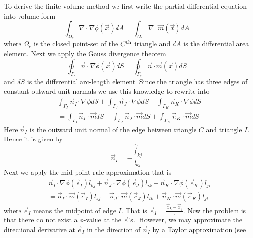 \documentclass[preprint,nocopyrightspace]{sigplanconf}
\begin{document}
To derive the finite volume method we first write the partial
differential equation into volume form
\begin{equation}
  \int_{\Omega_c} \nabla \cdot \nabla \phi(\vec x) dA 
  = 
  \int_{\Omega_c} \nabla \cdot \vec m(\vec x) dA
\end{equation}
where $\Omega_c$ is the closed point-set of the $C ^{\text{th}}$ triangle and
$dA$ is the differential area element. Next we apply the Gauss
divergence theorem
\begin{equation}
  \oint_{\Gamma_c} \vec n \cdot \nabla \phi(\vec x) dS
  = 
  \oint_{ \Gamma_c} \vec n \cdot \vec m(\vec x) dS
\end{equation}
and $dS$ is the differential arc-length element. Since the triangle
has three edges of constant outward unit normals we use this knowledge
to rewrite into
\begin{equation}
  \begin{split}
  &\int_{\Gamma_I} \vec n_I \cdot \nabla \phi dS
  +
  \int_{\Gamma_J} \vec n_J \cdot \nabla \phi dS
  +
  \int_{\Gamma_K} \vec n_K \cdot \nabla \phi dS\\
  &= 
  \int_{\Gamma_I} \vec n_I \cdot \vec m  dS
  +
  \int_{\Gamma_J} \vec n_J \cdot \vec m  dS
  +
  \int_{\Gamma_K} \vec n_K \cdot \vec m dS    
  \end{split}
\end{equation}
Here $\vec n_I$ is the outward unit normal of the edge between
triangle $C$ and triangle $I$. Hence it is given by
\begin{equation}
  \vec n_I =  - \frac{  \hat{ \vec l }_{kj}  }{  l_{kj}  }
\end{equation}
Next we apply the mid-point rule approximation that is
\begin{equation}
  \begin{split}
    &\vec n_I \cdot \nabla \phi(\vec e_I) l_{kj}
    +
    \vec n_J \cdot \nabla \phi(\vec e_J) l_{ik}
    +
    \vec n_K \cdot \nabla \phi(\vec e_K) l_{ji}\\
    &=
    \vec n_I \cdot \vec m(\vec e_I)  l_{kj} 
    + \vec n_J \cdot \vec m(\vec e_J)  l_{ik} 
    + \vec n_K \cdot \vec m(\vec e_K)  l_{ji} 
  \end{split}
\end{equation}
where $\vec e_I$ means the midpoint of edge $I$. That is $\vec e_I =
\frac{\vec x_k + \vec x_j}{2}$. Now the problem is that there do not exist
a $\phi$-value at the $\vec e$'s.. However, we may approximate the directional derivative at $\vec
e_I$ in the direction of $\vec n_I$ by a Taylor approximation (see
\end{document}
